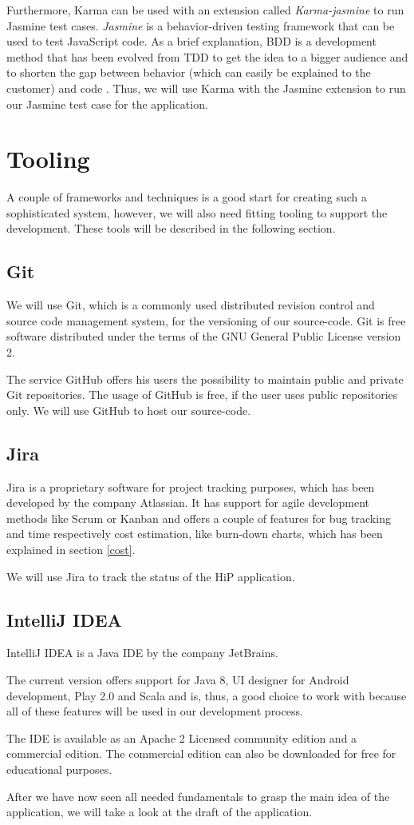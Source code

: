 Furthermore, Karma can be used with an extension called \emph{Karma-jasmine} to run Jasmine test cases. \emph{Jasmine} is a behavior-driven testing framework that can be used to test JavaScript code. As a brief explanation, \ac{BDD} is a development method that has been evolved from \ac{TDD} to get the idea to a bigger audience and to shorten the gap between behavior (which can easily be explained to the customer) and code \cite{BDD}. Thus, we will use Karma with the Jasmine extension to run our Jasmine test case for the application.
 
\section{Tooling}
A couple of frameworks and techniques is a good start for creating such a sophisticated system, however, we will also need fitting tooling to support the development. These tools will be described in the following section.

\subsection{Git}
We will use Git, which is a commonly used distributed revision control and source code management system, for the versioning of our source-code. Git is free software distributed under the terms of the GNU General Public License version 2.

The service GitHub offers his users the possibility to maintain public and private Git repositories. The usage of GitHub is free, if the user uses public repositories only. We will use GitHub to host our source-code.

\subsection{Jira}
Jira is a proprietary software for project tracking purposes, which has been developed by the company Atlassian. It has support for agile development methods like Scrum or Kanban and offers a couple of features for bug tracking and time respectively cost estimation, like burn-down charts, which has been explained in section \ref{cost}. 

We will use Jira to track the status of the \ac{HiP} application.

\subsection{IntelliJ IDEA}
IntelliJ IDEA is a Java \ac{IDE} by the company JetBrains. 

The current version offers support for Java 8, UI designer for Android development, Play 2.0 and Scala and is, thus, a good choice to work with because all of these features will be used in our development process.

The \ac{IDE} is available as an Apache 2 Licensed community edition and a commercial edition. The commercial edition can also be downloaded for free for educational purposes.

After we have now seen all needed fundamentals to grasp the main idea of the application, we will take a look at the draft of the application.
